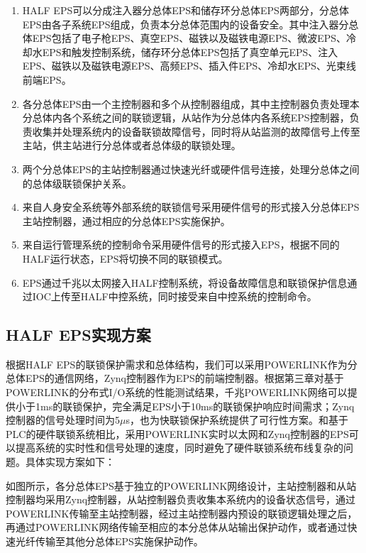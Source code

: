 \begin{enumerate}
  \item HALF EPS可以分成注入器分总体EPS和储存环分总体EPS两部分，分总体EPS由各子系统EPS组成，负责本分总体范围内的设备安全。其中注入器分总体EPS包括了电子枪EPS、真空EPS、磁铁以及磁铁电源EPS、微波EPS、冷却水EPS和触发控制系统，储存环分总体EPS包括了真空单元EPS、注入EPS、磁铁以及磁铁电源EPS、高频EPS、插入件EPS、冷却水EPS、光束线前端EPS。

  \item 各分总体EPS由一个主控制器和多个从控制器组成，其中主控制器负责处理本分总体内各个系统之间的联锁逻辑，从站作为分总体内各系统EPS控制器，负责收集并处理系统内的设备联锁故障信号，同时将从站监测的故障信号上传至主站，供主站进行分总体或者总体级的联锁处理。

  \item 两个分总体EPS的主站控制器通过快速光纤或硬件信号连接，处理分总体之间的总体级联锁保护关系。

  \item 来自人身安全系统等外部系统的联锁信号采用硬件信号的形式接入分总体EPS主站控制器，通过相应的分总体EPS实施保护。

  \item 来自运行管理系统的控制命令采用硬件信号的形式接入EPS，根据不同的HALF运行状态，EPS将切换不同的联锁模式。

  \item EPS通过千兆以太网接入HALF控制系统，将设备故障信息和联锁保护信息通过IOC上传至HALF中控系统，同时接受来自中控系统的控制命令。
\end{enumerate}

\subsection{HALF EPS实现方案}

根据HALF EPS的联锁保护需求和总体结构，我们可以采用POWERLINK作为分总体EPS的通信网络，Zynq控制器作为EPS的前端控制器。根据第三章对基于POWERLINK的分布式I/O系统的性能测试结果，千兆POWERLINK网络可以提供小于1ms的联锁保护，完全满足EPS小于10ms的联锁保护响应时间需求；Zynq控制器的信号处理时间为5$\mu$s，也为快联锁保护系统提供了可行性方案。和基于PLC的硬件联锁系统相比，采用POWERLINK实时以太网和Zynq控制器的EPS可以提高系统的实时性和信号处理的速度，同时避免了硬件联锁系统布线复杂的问题。具体实现方案如下：

如图所示，各分总体EPS基于独立的POWERLINK网络设计，主站控制器和从站控制器均采用Zynq控制器，从站控制器负责收集本系统内的设备状态信号，通过POWERLINK传输至主站控制器，经过主站控制器内预设的联锁逻辑处理之后，再通过POWERLINK网络传输至相应的本分总体从站输出保护动作，或者通过快速光纤传输至其他分总体EPS实施保护动作。

